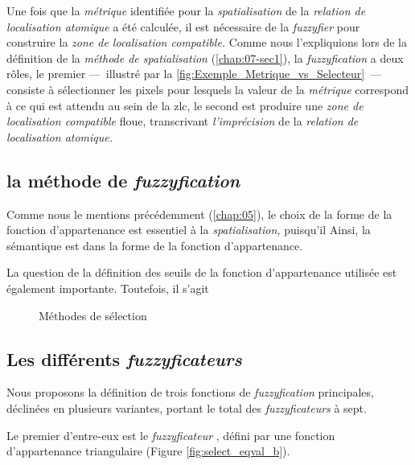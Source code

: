 Une fois que la \emph{métrique} identifiée pour la \emph{spatialisation} de la \emph{relation de localisation atomique} a été calculée, il est nécessaire de la \emph{fuzzyfier} pour construire la \emph{zone de localisation compatible.} Comme nous l'expliquions lors de la définition de la \emph{méthode de spatialisation} (\autoref{chap:07-sec1}), la \emph{fuzzyfication} a deux rôles, le premier ---~illustré par la \autoref{fig:Exemple_Metrique_vs_Selecteur}~--- consiste à sélectionner les pixels pour lesquels la valeur de la \emph{métrique} correspond à ce qui est attendu au sein de la \ac{zlc}, le second est produire une \emph{zone de localisation compatible} floue, transcrivant \emph{l'imprécision} de la \emph{relation de localisation atomique.}

\subsection{la méthode de \emph{fuzzyfication}}

%
Comme nous le mentions précédemment (\autoref{chap:05}), le choix de la forme de la fonction d'appartenance est essentiel à la \emph{spatialisation,} puisqu'il
%
Ainsi, la sémantique est dans la forme de la fonction d'appartenance.

%
La question de la définition des seuils de la fonction d'appartenance utilisée est également importante. Toutefois, il s'agit 

\begin{figure}
  \centering
  
  \caption{Méthodes de sélection}
  \label{fig:importance_fuzzyfication}
\end{figure}

\subsection{Les différents \emph{fuzzyficateurs}}


Nous proposons la définition de trois fonctions de \emph{fuzzyfication} principales, déclinées en plusieurs variantes, portant le total des \emph{fuzzyficateurs} à sept.

Le premier d'entre-eux est le \emph{fuzzyficateur} , défini par une fonction d'appartenance triangulaire (Figure \ref{fig:select_eqval_b}).


